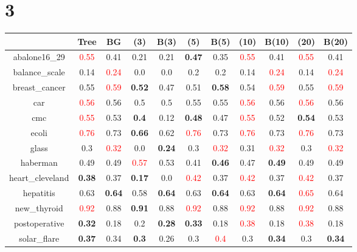\documentclass{article}%
\begin{document}
\section*{3}%
\begin{tabular}{c|cccccccccc}%
\hline%
&Tree&BG&(3)&B(3)&(5)&B(5)&(10)&B(10)&(20)&B(20)\\%
\hline%
abalone16\_29&\textcolor{red}{ 
0.55
}&0.41&0.21&0.21&\textbf{0.47}&0.35&\textcolor{red}{ 
0.55
}&0.41&\textcolor{red}{ 
0.55
}&0.41\\%
\hline%
balance\_scale&0.14&\textcolor{red}{ 
0.24
}&0.0&0.0&0.2&0.2&0.14&\textcolor{red}{ 
0.24
}&0.14&\textcolor{red}{ 
0.24
}\\%
\hline%
breast\_cancer&0.55&\textcolor{red}{ 
0.59
}&\textbf{0.52}&0.47&0.51&\textbf{0.58}&0.54&\textcolor{red}{ 
0.59
}&0.55&\textcolor{red}{ 
0.59
}\\%
\hline%
car&\textcolor{red}{ 
0.56
}&0.56&0.5&0.5&0.55&0.55&\textcolor{red}{ 
0.56
}&0.56&\textcolor{red}{ 
0.56
}&0.56\\%
\hline%
cmc&\textcolor{red}{ 
0.55
}&0.53&\textbf{0.4}&0.12&\textbf{0.48}&0.47&\textcolor{red}{ 
0.55
}&0.52&\textbf{0.54}&0.53\\%
\hline%
ecoli&\textcolor{red}{ 
0.76
}&0.73&\textbf{0.66}&0.62&\textcolor{red}{ 
0.76
}&0.73&\textcolor{red}{ 
0.76
}&0.73&\textcolor{red}{ 
0.76
}&0.73\\%
\hline%
glass&0.3&\textcolor{red}{ 
0.32
}&0.0&\textbf{0.24}&0.3&\textcolor{red}{ 
0.32
}&0.31&\textcolor{red}{ 
0.32
}&0.3&\textcolor{red}{ 
0.32
}\\%
\hline%
haberman&0.49&0.49&\textcolor{red}{ 
0.57
}&0.53&0.41&\textbf{0.46}&0.47&\textbf{0.49}&0.49&0.49\\%
\hline%
heart\_cleveland&\textbf{0.38}&0.37&\textbf{0.17}&0.0&\textcolor{red}{ 
0.42
}&0.37&\textcolor{red}{ 
0.42
}&0.37&\textcolor{red}{ 
0.42
}&0.37\\%
\hline%
hepatitis&0.63&\textbf{0.64}&0.58&\textbf{0.64}&0.63&\textbf{0.64}&0.63&\textbf{0.64}&\textcolor{red}{ 
0.65
}&0.64\\%
\hline%
new\_thyroid&\textcolor{red}{ 
0.92
}&0.88&\textbf{0.91}&0.88&\textcolor{red}{ 
0.92
}&0.88&\textcolor{red}{ 
0.92
}&0.88&\textcolor{red}{ 
0.92
}&0.88\\%
\hline%
postoperative&\textbf{0.32}&0.18&0.2&\textbf{0.28}&\textbf{0.33}&0.18&\textcolor{red}{ 
0.38
}&0.18&\textcolor{red}{ 
0.38
}&0.18\\%
\hline%
solar\_flare&\textbf{0.37}&0.34&\textbf{0.3}&0.26&0.3&\textcolor{red}{ 
0.4
}&0.3&\textbf{0.34}&0.3&\textbf{0.34}\\%

\end{tabular}
\end{document}
